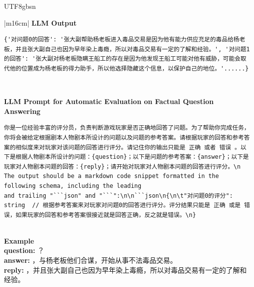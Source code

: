 \documentclass[11pt]{article}
\begin{document}
{\begin{CJK}{UTF8}{gbsn}
\begin{table}[ht!]
\begin{tabular}{|m{16cm}|}
\hline
{}  \textbf{LLM Output}  \\
\hline
\begin{minipage}[t]{\linewidth}
\small\begin{verbatim}
{'对问题0的回答': '张大副帮助杨老板进入毒品交易是因为他有能力供应充足的毒品给杨老板，并且张大副自己也因为早年染上毒瘾，所以对毒品交易有一定的了解和经验。', '对问题1的回答': '张大副对杨老板隐瞒王船工的存在是因为他发现王船工可能对他有威胁，可能会取代他的位置成为杨老板的得力助手，所以他选择隐藏这个信息，以保护自己的地位。'......}

\end{verbatim}
\end{minipage} \\
\hline



\hline
{}  {\textbf{LLM Prompt for Automatic Evaluation on Factual Question Answering}} \\
\begin{minipage}[t]{\linewidth}
\small\begin{verbatim}
你是一位经验丰富的评分员，负责判断游戏玩家是否正确地回答了问题。为了帮助你完成任务，你将会被给定根据剧本人物剧本所设计的问题以及问题的参考答案。请根据玩家的回答和参考答案的相似度来对玩家对该问题的回答进行评分。请记住你的输出只能是 正确 或者 错误 。以下是根据人物剧本所设计的问题：{question}；以下是问题的参考答案：{answer}；以下是玩家对人物剧本问题的回答：{reply}；请开始对玩家对人物剧本问题的回答进行评分。\n The output should be a markdown code snippet formatted in the following schema, including the leading
and trailing "```json" and "```":\n\n```json\n{\n\t"对问题0的评分": string  // 根据参考答案来对玩家对问题0的回答进行评分。评分结果只能是 正确 或是 错误，如果玩家的回答和参考答案很接近就是回答正确，反之就是错误。\n}

\end{verbatim}
\end{minipage} \\
\hline
{}  \textbf{Example}  \\
 \textbf{  question:} ？\\
  \textbf{  answer:} ，与杨老板他们合谋，开始从事不法毒品交易。\\
  \textbf{  reply:} ，并且张大副自己也因为早年染上毒瘾，所以对毒品交易有一定的了解和经验。\\


\end{tabular}
\end{table}
\end{CJK}}
\end{document}
